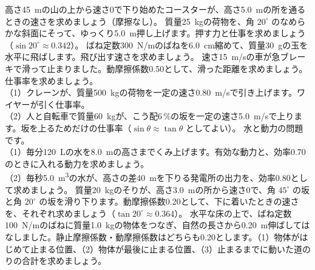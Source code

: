 \bkendproblems
{}
\bkproblem 高さ\qty{45}{m}の山の上から速さ0で下り始めたコースターが、高さ\qty{5.0}{m}の所を通るときの速さを求めましょう（摩擦なし）。
\bkproblem 質量\qty{25}{kg}の荷物を、角 $20^\circ$ のなめらかな斜面にそって、ゆっくり\qty{5.0}{m}押し上げます。押す力と仕事を求めましょう（$\sin20^\circ\approx0.342$）。
\bkproblem ばね定数\qty{300}{N/m}のばねを\qty{6.0}{cm}縮めて、質量\qty{30}{g}の玉を水平に飛ばします。飛び出す速さを求めましょう。
\bkproblem 速さ\qty{15}{m/s}の車が急ブレーキで滑って止まりました。動摩擦係数0.50として、滑った距離を求めましょう。
\bkproblem 仕事率を求めましょう。\\
（1）クレーンが、質量\qty{500}{kg}の荷物を一定の速さ\qty{0.80}{m/s}で引き上げます。ワイヤーが引く仕事率。\\
（2）人と自転車で質量\qty{60}{kg}が、こう配6\,\%の坂を一定の速さ\qty{5.0}{m/s}で上ります。坂を上るためだけの仕事率（$\sin\theta\approx\tan\theta$ としてよい）。
\bkproblem 水と動力の問題です。\\
（1）毎分\qty{120}{L}の水を\qty{8.0}{m}の高さまでくみ上げます。有効な動力と、効率0.70のときに入れる動力を求めましょう。\\
（2）毎秒\qty{5.0}{m^3}の水が、高さの差\qty{40}{m}を下りる発電所の出力を、効率0.80として求めましょう。
\bkproblem 質量\qty{20}{kg}のそりが、高さ\qty{3.0}{m}の所から速さ0で、角 $45^\circ$ の坂と角 $20^\circ$ の坂を滑り下ります。動摩擦係数0.20として、下に着いたときの速さを、それぞれ求めましょう（$\tan20^\circ\approx0.364$）。
\bkproblem 水平な床の上で、ばね定数\qty{100}{N/m}のばねに質量\qty{1.0}{kg}の物体をつなぎ、自然の長さから\qty{0.20}{m}伸ばしてはなしました。静止摩擦係数・動摩擦係数はどちらも0.20とします。（1）物体がはじめて止まる位置、（2）物体が最後に止まる位置、（3）止まるまでに動いた道のりの合計を求めましょう。
